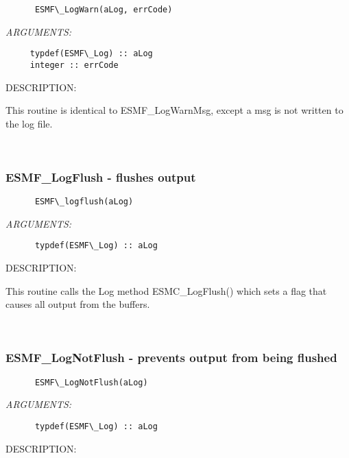   
\begin{verbatim}      ESMF\_LogWarn(aLog, errCode)\end{verbatim}{\em ARGUMENTS:}
\begin{verbatim}     typdef(ESMF\_Log) :: aLog
     integer :: errCode\end{verbatim}
{\sf DESCRIPTION:\\ }


     This routine is identical to ESMF\_LogWarnMsg, except a msg is
     not written to the log file.
   
 
\mbox{}\hrulefill\ 
 
\subsubsection [ESMF\_LogFlush] {ESMF\_LogFlush - flushes output}


  
\begin{verbatim}      ESMF\_logflush(aLog)\end{verbatim}{\em ARGUMENTS:}
\begin{verbatim}      typdef(ESMF\_Log) :: aLog\end{verbatim}
{\sf DESCRIPTION:\\ }


      This routine calls the Log method ESMC\_LogFlush() which sets a flag
      that causes all output from the buffers.
   
 
\mbox{}\hrulefill\ 
 
\subsubsection [ESMF\_LogNotFlush] {ESMF\_LogNotFlush - prevents output from being flushed}


  
\begin{verbatim}      ESMF\_LogNotFlush(aLog)\end{verbatim}{\em ARGUMENTS:}
\begin{verbatim}      typdef(ESMF\_Log) :: aLog\end{verbatim}
{\sf DESCRIPTION:\\ }


